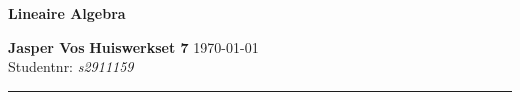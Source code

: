 \documentclass{article}
\begin{document}
{\Large \textbf{Lineaire Algebra}}

\bigskip

\textbf{Jasper Vos} \hfill \textbf{Huiswerkset 7} \hfill \today \\
Studentnr: \emph{s2911159}

\rule{\textwidth}{2pt}

\bigskip
\end{document}
